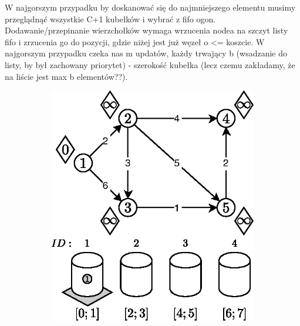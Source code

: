 W najgorszym przypadku by doskanować się do najmniejszego elementu musimy przeglądnąć wszystkie C+1 kubełków i wybrać z fifo ogon. Dodawanie/przepinanie wierzchołków wymaga wrzucenia nodea na szczyt listy fifo i zrzucenia go do pozycji, gdzie niżej jest już węzeł o <= koszcie.
W najgorszym przypadku czeka nas m updatów, każdy trwający b (wsadzanie do listy, by był zachowany priorytet) - szerokość kubełka (lecz czemu zakładamy, że na liście jest max b elementów??).
\begin{figure}[!htbp]
	\centering
	\begin{subfigure}[b]{0.33\textwidth}
		\includegraphics[width=\textwidth]{Chapter_II/3/a.eps}
		\caption{}
	\end{subfigure}%
	\begin{subfigure}[b]{0.33\textwidth}

\end{subfigure}
\end{figure}
